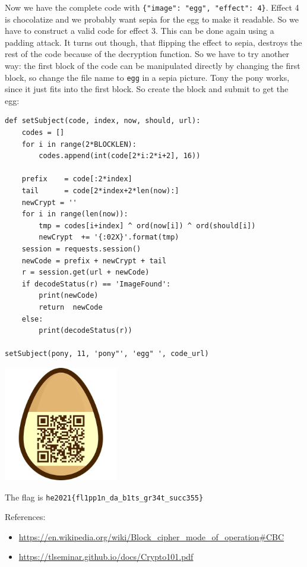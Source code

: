 \documentclass[english,a4paper,nols,noindent]{tufte-handout}
\begin{document}
Now we have the complete code with \verb+{"image": "egg", "effect": 4}+. Effect
4 is chocolatize and we probably want sepia for the egg to make it readable.
So we have to construct a valid code for effect 3.  This can be done again
using a padding attack.  It turns out though, that flipping the effect to
sepia, destroys the rest of the code because of the decryption function.  So we
have to try another way: the first block of the code can be manipulated
directly by changing the first block, so change the file name to \verb+egg+ in
a sepia picture.  Tony the pony works, since it just fits into the first block.
So create the block and submit to get the egg:

\begin{verbatim}
def setSubject(code, index, now, should, url):
    codes = []
    for i in range(2*BLOCKLEN):
        codes.append(int(code[2*i:2*i+2], 16))

    prefix    = code[:2*index]
    tail      = code[2*index+2*len(now):]
    newCrypt = ''
    for i in range(len(now)):
        tmp = codes[i+index] ^ ord(now[i]) ^ ord(should[i])
        newCrypt  += '{:02X}'.format(tmp)
    session = requests.session()
    newCode = prefix + newCrypt + tail
    r = session.get(url + newCode)
    if decodeStatus(r) == 'ImageFound':
        print(newCode)
        return  newCode
    else:
        print(decodeStatus(r))

setSubject(pony, 11, 'pony"', 'egg" ', code_url)
\end{verbatim}

\begin{marginfigure}
    \includegraphics[width=50mm]{ch30/egg.png}
\end{marginfigure}
 
The flag is \verb+he2021{fl1pp1n_da_b1ts_gr34t_succ355}+

References:
\begin{itemize}
\item \url{https://en.wikipedia.org/wiki/Block_cipher_mode_of_operation#CBC}
\item \url{https://tlseminar.github.io/docs/Crypto101.pdf}
\end{itemize}
\end{document}

